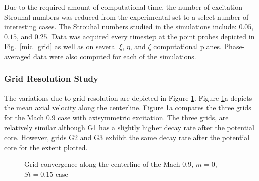 \documentclass[english]{aiaa-tc}
\begin{document}
Due to the required amount of computational time, the number of excitation Strouhal numbers was reduced from the experimental set to a select number of interesting cases.
The Strouhal numbers studied in the
simulations include: $0.05$, $0.15$, and $0.25$. Data was acquired
every timestep at the point probes depicted in Fig.~\ref{mic_grid}
as well as on several $\xi$, $\eta$, and $\zeta$ computational planes.
Phase-averaged data were also computed for each of the simulations.

\subsubsection{Grid Resolution Study}
 The variations due to grid resolution are depicted in Figure \ref{meangridM09}. Figure \ref{meangridM09}a depicts the mean axial velocity along the centerline. Figure \ref{meangridM09}a compares the three grids for the Mach 0.9 case with axisymmetric excitation. The three grids, are relatively similar although G1 has a slightly higher decay rate after the potential core. However, grids G2 and G3 exhibit the same decay rate after the potential core for the extent plotted.
\begin{figure}
\begin{center}
\caption{Grid convergence along the centerline of the Mach 0.9, $m=0$, $St=0.15$ case\label{meangridM09}}
\end{center}
 \end{figure}
\end{document}
